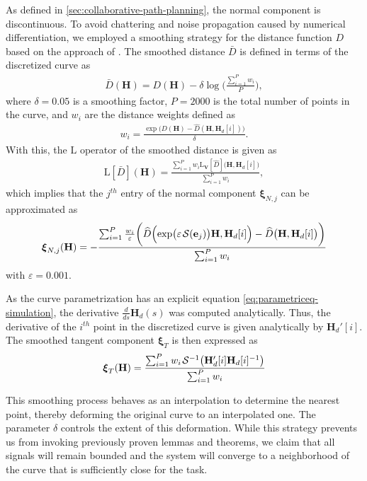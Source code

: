 As defined in \cref{sec:collaborative-path-planning}, the normal component is discontinuous. To avoid chattering and noise propagation caused by numerical differentiation, we employed a smoothing strategy for the distance function $D$ based on the approach of \citet{viniciusmooth}. The smoothed distance $\bar{D}$ is defined in terms of the discretized curve as
\begin{align}
    \bar{D}(\mathbf{H}) = D(\mathbf{H}) - \delta\log\biggl(\frac{\sum_{i=1}^{P}w_i}{P}\biggr),
\end{align}
where $\delta=0.05$ is a smoothing factor, $P=\num{2000}$ is the total number of points in the curve, and $w_i$ are the distance weights defined as
\begin{align}
    w_i = \frac{\exp\bigl(D(\mathbf{H}) - \widehat{D}(\mathbf{H}, \mathbf{H}_d[i])\bigr)}{\delta}.
\end{align}
With this, the $\text{L}$ operator of the smoothed distance is given as
\begin{align}
    \text{L}[\bar{D}](\mathbf{H}) = \frac{\sum_{i=1}^{P}w_i\text{L}_\mathbf{V}[\widehat{D}]\bigl(\mathbf{H}, \mathbf{H}_d[i]\bigr)}{\sum_{i=1}^{P}w_i},
\end{align}
which implies that the $j^{th}$ entry of the normal component $\boldsymbol{\xi}_{N,j}$ can be approximated as
\begin{align}
    \boldsymbol{\xi}_{N,j}(\mathbf{H}) = -\frac{\sum_{i=1}^{P} \frac{w_i}{\varepsilon}\biggl(\widehat{D}\Bigl(\exp\bigl(\varepsilon\SL[\mathbf{e}_j]\bigr)\mathbf{H}, \mathbf{H}_d[i]\Bigr)- \widehat{D}\bigl(\mathbf{H}, \mathbf{H}_d[i]\bigr)\biggr)}{\sum_{i=1}^{P}w_i}
\end{align}
with $\varepsilon=0.001$.

As the curve parametrization has an explicit equation \eqref{eq:parametriceq-simulation}, the derivative $\frac{d}{ds}\mathbf{H}_d(s)$ was computed analytically. Thus, the derivative of the $i^{th}$ point in the discretized curve is given analytically by $\mathbf{H}_d'[i]$. The smoothed tangent component $\boldsymbol{\xi}_T$ is then expressed as
\begin{align}
    \boldsymbol{\xi}_T(\mathbf{H}) = \frac{\sum_{i=1}^{P} w_i\invSL\bigl(\mathbf{H}_d'[i]\mathbf{H}_d[i]^{-1}\bigr)}{\sum_{i=1}^{P} w_i}
\end{align}

This smoothing process behaves as an interpolation to determine the nearest point, thereby deforming the original curve to an interpolated one. The parameter $\delta$ controls the extent of this deformation. While this strategy prevents us from invoking previously proven lemmas and theorems, we claim that all signals will remain bounded and the system will converge to a neighborhood of the curve that is sufficiently close for the task.

